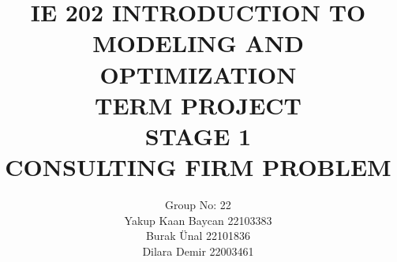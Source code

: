 \documentclass[11pt]{article}
\begin{document}
\title{IE 202 INTRODUCTION TO MODELING AND OPTIMIZATION\\ TERM PROJECT\\STAGE 1 \\CONSULTING FIRM PROBLEM}
\author{Group No: 22\\Yakup Kaan Baycan 22103383\\ Burak Ünal  22101836 \\ Dilara Demir  22003461}
\maketitle
\newpage

	
	\newcommand{\Pf}{\mathbf{P}}
	\newcommand{\UP}[2]{\makebox[0pt]{\smash{\raisebox{1.5em}{$\phantom{#2}#1$}}}#2}
	\newcommand{\LF}[1]{\makebox[0pt]{$#1$\hspace{4.5em}}}
	
\end{document}
